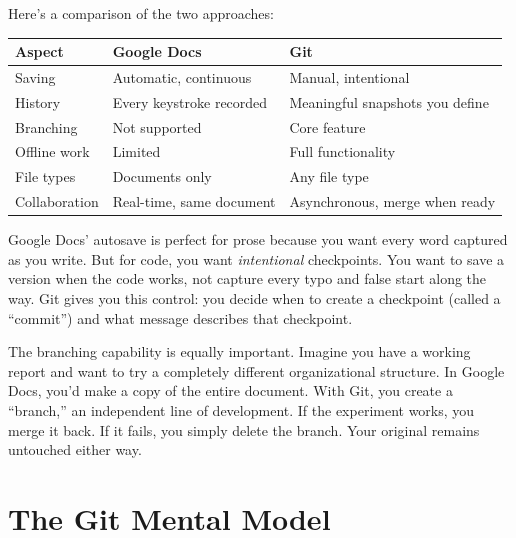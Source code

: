 \documentclass[
  letterpaper,
  DIV=11,
  numbers=noendperiod]{scrreprt}
\begin{document}
Here's a comparison of the two approaches:

\begin{longtable}[]{@{}
  >{\raggedright\arraybackslash}p{}
  >{\raggedright\arraybackslash}p{}
  >{\raggedright\arraybackslash}p{}@{}}
\toprule\noalign{}
\begin{minipage}[b]{\linewidth}\raggedright
Aspect
\end{minipage} & \begin{minipage}[b]{\linewidth}\raggedright
Google Docs
\end{minipage} & \begin{minipage}[b]{\linewidth}\raggedright
Git
\end{minipage} \\
\midrule\noalign{}
\endhead
\bottomrule\noalign{}
\endlastfoot
Saving & Automatic, continuous & Manual, intentional \\
History & Every keystroke recorded & Meaningful snapshots you define \\
Branching & Not supported & Core feature \\
Offline work & Limited & Full functionality \\
File types & Documents only & Any file type \\
Collaboration & Real-time, same document & Asynchronous, merge when
ready \\
\end{longtable}

Google Docs' autosave is perfect for prose because you want every word
captured as you write. But for code, you want \emph{intentional}
checkpoints. You want to save a version when the code works, not capture
every typo and false start along the way. Git gives you this control:
you decide when to create a checkpoint (called a ``commit'') and what
message describes that checkpoint.

The branching capability is equally important. Imagine you have a
working report and want to try a completely different organizational
structure. In Google Docs, you'd make a copy of the entire document.
With Git, you create a ``branch,'' an independent line of development.
If the experiment works, you merge it back. If it fails, you simply
delete the branch. Your original remains untouched either way.

\section{The Git Mental Model}\label{the-git-mental-model}
\end{document}
